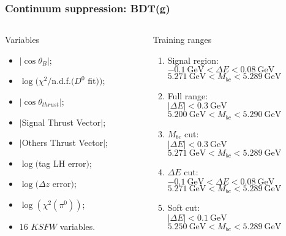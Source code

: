 \documentclass[10 pt,compress,mathserif]{beamer}
\begin{document}
\begin{frame}[containsverbatim]
\frametitle{Continuum suppression: BDT(g)}
\begin{columns}
 \begin{column}{0.5\textwidth}
 \begin{block}{Variables}
  \begin{itemize}
   \item $\left|\cos\theta_{B}\right|$;
   \item $\log(\chi^2/$n.d.f.$(D^0$ fit$))$;
   \item $\left|\cos\theta_{thrust}\right|$;
   \item $|$Signal Thrust Vector$|$;
   \item $|$Others Thrust Vector$|$;
   \item $\log($tag LH error$)$;
   \item $\log(\Delta z$ error$)$;
   \item $\log(\chi^2(\pi^0))$;
   \item $16$ $KSFW$ variables.
  \end{itemize}
 \end{block}
 \end{column}
 \begin{column}{0.5\textwidth}
  \begin{block}{Training ranges}
  \begin{small}
   \begin{enumerate}
   \item Signal region:\\
    $-0.1\ \text{GeV}<\Delta E<0.08\ \text{GeV}$\\
    $5.271\ \text{GeV}<M_{bc}<5.289\ \text{GeV}$
   \item Full range:\\
    $\left|\Delta E\right|<0.3\ \text{GeV}$\\
    $5.200\ \text{GeV}<M_{bc}<5.290\ \text{GeV}$
   \item $M_{bc}$ cut:\\
    $\left|\Delta E\right|<0.3\ \text{GeV}$\\
    $5.271\ \text{GeV}<M_{bc}<5.289\ \text{GeV}$
   \item $\Delta E$ cut:\\
    $-0.1\ \text{GeV}<\Delta E<0.08\ \text{GeV}$\\
    $5.271\ \text{GeV}<M_{bc}<5.289\ \text{GeV}$
   \item Soft cut:\\
    $\left|\Delta E\right|<0.1\ \text{GeV}$\\
    $5.250\ \text{GeV}<M_{bc}<5.289\ \text{GeV}$
  \end{enumerate}
  \end{small}
  \end{block}
 \end{column}
\end{columns}
\end{frame}
\end{document}
